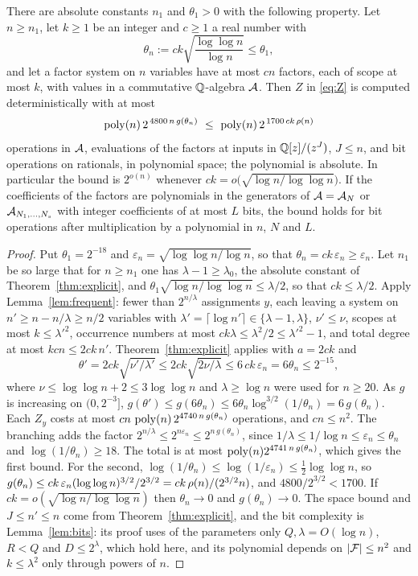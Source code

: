 \begin{theorem}\label{thm:density}
There are absolute constants $n_1$ and $\theta_1>0$ with the following property.
Let $n\ge n_1$, let $k\ge1$ be an integer and $c\ge1$ a real number with
\[
  \theta_n:=ck\sqrt{\frac{\log\log n}{\log n}}\le\theta_1,
\]
and let a factor system on $n$ variables have at most $cn$ factors, each of scope
at most $k$, with values in a commutative $\mathbb{Q}$-algebra $\mathcal{A}$. Then $Z$ in
\eqref{eq:Z} is computed deterministically with at most
\[
  \poly(n)\,2^{\,4800\,n\,g(\theta_n)}\ \le\ \poly(n)\,2^{\,1700\,ck\,\rhon(n)}
\]
operations in $\mathcal{A}$, evaluations of the factors at inputs in $\mathbb{Q}[z]/(z^{J})$,
$J\le n$, and bit operations on rationals, in polynomial space; the polynomial is
absolute. In particular the bound is $2^{o(n)}$ whenever
$ck=o\bigl(\sqrt{\log n/\log\log n}\bigr)$. If the coefficients of the factors are
polynomials in the generators of $\mathcal{A}=\mathcal{A}_N$ or $\mathcal{A}_{N_1,\dots,N_s}$ with integer
coefficients of at most $L$ bits, the bound holds for bit operations after
multiplication by a polynomial in $n$, $N$ and $L$.
\end{theorem}

\begin{proof}
Put $\theta_1=2^{-18}$ and $\varepsilon_n=\sqrt{\log\log n/\log n}$, so that
$\theta_n=ck\,\varepsilon_n\ge\varepsilon_n$. Let $n_1$ be so large that for
$n\ge n_1$ one has $\lambda-1\ge\lambda_0$, the absolute constant of
Theorem~\ref{thm:explicit}, and $\theta_1\sqrt{\log n/\log\log n}\le\lambda/2$, so
that $ck\le\lambda/2$. Apply Lemma~\ref{lem:frequent}: fewer than $2^{n/\lambda}$
assignments $y$, each leaving a system on $n'\ge n-n/\lambda\ge n/2$ variables with
$\lambda'=\lceil\log n'\rceil\in\{\lambda-1,\lambda\}$, $\nu'\le\nu$, scopes at most
$k\le\lambda'^2$, occurrence numbers at most $ck\lambda\le\lambda^2/2\le\lambda'^2-1$,
and total degree at most $kcn\le2ck\,n'$. Theorem~\ref{thm:explicit} applies with
$a=2ck$ and
\[
  \theta'=2ck\sqrt{\nu'/\lambda'}\le2ck\sqrt{2\nu/\lambda}\le6\,ck\,\varepsilon_n=6\theta_n\le2^{-15},
\]
where $\nu\le\log\log n+2\le3\log\log n$ and $\lambda\ge\log n$ were used for $n\ge20$.
As $g$ is increasing on $(0,2^{-3}]$,
$g(\theta')\le g(6\theta_n)\le6\theta_n\log^{3/2}(1/\theta_n)=6\,g(\theta_n)$.
Each $Z_y$ costs at most $cn\,\operatorname{poly}(n)\,2^{4740\,n\,g(\theta_n)}$ operations, and
$cn\le n^2$. The branching adds the factor $2^{n/\lambda}\le2^{n\varepsilon_n}\le2^{n\,g(\theta_n)}$,
since $1/\lambda\le1/\log n\le\varepsilon_n\le\theta_n$ and $\log(1/\theta_n)\ge18$. The total is
at most $\operatorname{poly}(n)2^{4741\,n\,g(\theta_n)}$, which gives the first bound. For the second,
$\log(1/\theta_n)\le\log(1/\varepsilon_n)\le\frac12\log\log n$, so
$g(\theta_n)\le ck\,\varepsilon_n(\log\log n)^{3/2}/2^{3/2}=ck\,\rho(n)/(2^{3/2}n)$,
and $4800/2^{3/2}<1700$. If $ck=o(\sqrt{\log n/\log\log n})$ then $\theta_n\to0$ and
$g(\theta_n)\to0$. The space bound and $J\le n'\le n$ come from
Theorem~\ref{thm:explicit}, and the bit complexity is Lemma~\ref{lem:bits}: its
proof uses of the parameters only $Q,\lambda=O(\log n)$, $R<Q$ and $D\le2^{\lambda}$,
which hold here, and its polynomial depends on $|\mathcal{F}|\le n^2$ and $k\le\lambda^2$ only
through powers of $n$.
\end{proof}


